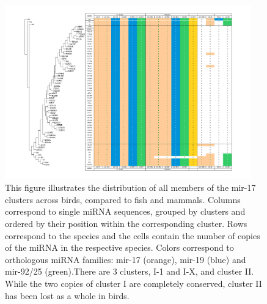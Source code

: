 \documentclass[10pt]{bmc_article}
\newenvironment{bmcformat}{\begin{raggedright}\baselineskip20pt\sloppy\setboolean{publ}{false}}{\end{raggedright}\baselineskip20pt\sloppy}
\begin{document}
\begin{bmcformat}
\begin{figure}[ht]
  \includegraphics[width=0.95\textwidth]{figures/mir-17-cluster.pdf}
  \caption[Presence/absence table of mir-17 miRNA clusters]{
This figure illustrates the distribution of all members of the mir-17 clusters across birds, compared to fish and mammals. Columns correspond to single miRNA sequences, grouped by clusters and ordered by their position within the corresponding cluster. Rows correspond to the species and the cells contain the number of copies of the miRNA in the respective species. Colors correspond to orthologous miRNA families: mir-17 (orange), mir-19 (blue) and mir-92/25 (green).There are 3 clusters, I-1 and I-X, and cluster II.  While the two copies of cluster I are completely conserved, cluster II has been lost as a whole in birds.}\label{fig:8}
\end{figure}


\end{bmcformat}
\end{document}
